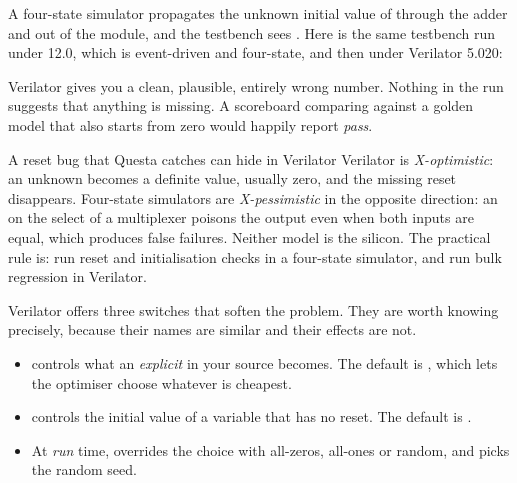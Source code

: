 A four-state simulator propagates the unknown initial value of 
through the adder and out of the module, and the testbench sees . Here
is the same testbench run under  12.0, which is
event-driven and four-state, and then under Verilator 5.020:


Verilator gives you a clean, plausible, entirely wrong number. Nothing in the
run suggests that anything is missing. A scoreboard comparing against a golden
model that also starts from zero would happily report \emph{pass}.

\begin{gotcha}{A reset bug that Questa catches can hide in Verilator}
Verilator is \emph{X-optimistic}: an unknown becomes a definite value, usually
zero, and the missing reset disappears. Four-state simulators are
\emph{X-pessimistic} in the opposite direction: an  on the select of a
multiplexer poisons the output even when both inputs are equal, which produces
false failures. Neither model is the silicon. The practical rule is: run reset
and initialisation checks in a four-state simulator, and run bulk regression in
Verilator.
\end{gotcha}

Verilator offers three switches that soften the problem. They are worth
knowing precisely, because their names are similar and their effects are not.

\begin{itemize}
  \item {} controls what an \emph{explicit}
         in your source becomes. The default is , which
        lets the optimiser choose whatever is cheapest.
  \item {} controls the initial value of a
        variable that has no reset. The default is .
  \item At \emph{run} time,  overrides the
         choice with all-zeros, all-ones or random, and
         picks the random seed.
\end{itemize}


